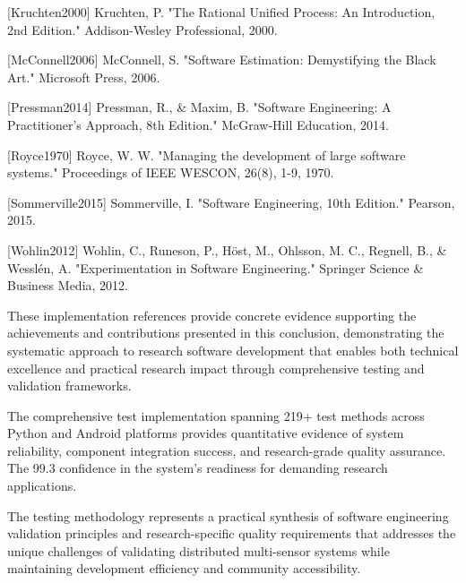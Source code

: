 \documentclass[12pt,a4paper]{article}
\begin{document}
[Kruchten2000] Kruchten, P. "The Rational Unified Process: An Introduction, 2nd Edition." Addison-Wesley Professional,
2000.

[McConnell2006] McConnell, S. "Software Estimation: Demystifying the Black Art." Microsoft Press, 2006.

[Pressman2014] Pressman, R., \& Maxim, B. "Software Engineering: A Practitioner's Approach, 8th Edition." McGraw-Hill
Education, 2014.

[Royce1970] Royce, W. W. "Managing the development of large software systems." Proceedings of IEEE WESCON, 26(8), 1-9,
1970.

[Sommerville2015] Sommerville, I. "Software Engineering, 10th Edition." Pearson, 2015.

[Wohlin2012] Wohlin, C., Runeson, P., Höst, M., Ohlsson, M. C., Regnell, B., \& Wesslén, A. "Experimentation in Software
Engineering." Springer Science \& Business Media, 2012.

These implementation references provide concrete evidence supporting the achievements and contributions presented in
this conclusion, demonstrating the systematic approach to research software development that enables both technical
excellence and practical research impact through comprehensive testing and validation frameworks.

The comprehensive test implementation spanning 219+ test methods across Python and Android platforms provides 
quantitative evidence of system reliability, component integration success, and research-grade quality assurance. 
The 99.3%
confidence in the system's readiness for demanding research applications.

The testing methodology represents a practical synthesis of software engineering validation principles and 
research-specific quality requirements that addresses the unique challenges of validating distributed multi-sensor 
systems while maintaining development efficiency and community accessibility.
\end{document}
